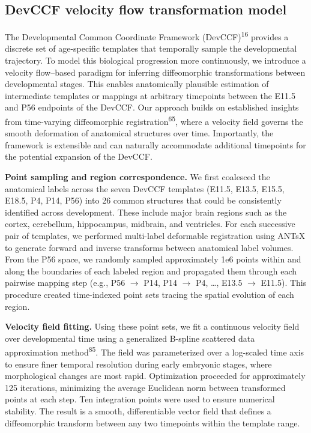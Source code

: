 \documentclass[
  12pt,
]{article}
\begin{document}
\subsection{DevCCF velocity flow transformation
model}\label{devccf-velocity-flow-transformation-model}

The Developmental Common Coordinate Framework
(DevCCF)\textsuperscript{16} provides a discrete set of age-specific
templates that temporally sample the developmental trajectory. To model
this biological progression more continuously, we introduce a velocity
flow--based paradigm for inferring diffeomorphic transformations between
developmental stages. This enables anatomically plausible estimation of
intermediate templates or mappings at arbitrary timepoints between the
E11.5 and P56 endpoints of the DevCCF. Our approach builds on
established insights from time-varying diffeomorphic
registration\textsuperscript{65}, where a velocity field governs the
smooth deformation of anatomical structures over time. Importantly, the
framework is extensible and can naturally accommodate additional
timepoints for the potential expansion of the DevCCF.

\textbf{Point sampling and region correspondence.} We first coalesced
the anatomical labels across the seven DevCCF templates (E11.5, E13.5,
E15.5, E18.5, P4, P14, P56) into 26 common structures that could be
consistently identified across development. These include major brain
regions such as the cortex, cerebellum, hippocampus, midbrain, and
ventricles. For each successive pair of templates, we performed
multi-label deformable registration using ANTsX to generate forward and
inverse transforms between anatomical label volumes. From the P56 space,
we randomly sampled approximately 1e6 points within and along the
boundaries of each labeled region and propagated them through each
pairwise mapping step (e.g., P56 \(\rightarrow\) P14, P14
\(\rightarrow\) P4, \ldots, E13.5 \(\rightarrow\) E11.5). This procedure
created time-indexed point sets tracing the spatial evolution of each
region.

\textbf{Velocity field fitting.} Using these point sets, we fit a
continuous velocity field over developmental time using a generalized
B-spline scattered data approximation method\textsuperscript{85}. The
field was parameterized over a log-scaled time axis to ensure finer
temporal resolution during early embryonic stages, where morphological
changes are most rapid. Optimization proceeded for approximately 125
iterations, minimizing the average Euclidean norm between transformed
points at each step. Ten integration points were used to ensure
numerical stability. The result is a smooth, differentiable vector field
that defines a diffeomorphic transform between any two timepoints within
the template range.
\end{document}
